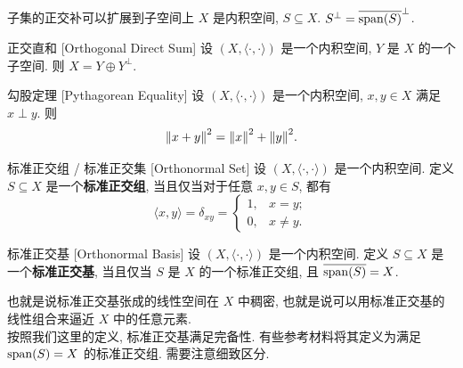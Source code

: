         \begin{ppt}
            {子集的正交补可以扩展到子空间上}
            \(X\) 是内积空间, \(S\subseteq X\). $S^\perp=\overline{\operatorname{span}(S)}^\perp$.
        \end{ppt}

        \begin{ppt}
            {正交直和}
            [Orthogonal Direct Sum]
            设 \((X, \langle\cdot,\cdot\rangle)\) 是一个内积空间, \(Y\) 是 \(X\) 的一个子空间. 则 \(X=Y\oplus Y^\perp\).
        \end{ppt}

        \begin{ppt}
            {勾股定理}
            [Pythagorean Equality]
            设 \((X, \langle\cdot,\cdot\rangle)\) 是一个内积空间, \(x,y\in X\) 满足 \(x\perp y\). 则
            \[\norm{x+y}^2=\norm{x}^2+\norm{y}^2.\]
        \end{ppt}

        \begin{dfn}
            {标准正交组 / 标准正交集}
            [Orthonormal Set]
            设 \((X, \langle\cdot,\cdot\rangle)\) 是一个内积空间. 定义 \(S\subseteq X\) 是一个\textbf{标准正交组}, 当且仅当对于任意 \(x,y\in S\), 都有
            \[\langle x,y\rangle=\delta_{xy}=\begin{cases}
                1, & x=y; \\
                0, & x\neq y.
            \end{cases}\]
        \end{dfn}

        \begin{dfn}
            [onb]
            {标准正交基}
            [Orthonormal Basis]
            设 \((X, \langle\cdot,\cdot\rangle)\) 是一个内积空间. 定义 \(S\subseteq X\) 是一个\textbf{标准正交基}, 当且仅当 \(S\) 是 \(X\) 的一个标准正交组, 且 \(\overline{\operatorname{span}(S)}=X\).
        \end{dfn}

        \begin{rmk}
            [Dedicatia]
            也就是说标准正交基张成的线性空间在 \(X\) 中稠密, 也就是说可以用标准正交基的线性组合来逼近 \(X\) 中的任意元素.\\
            按照我们这里的定义, 标准正交基满足完备性. 有些参考材料将其定义为满足 \(\operatorname{span}(S)=X\) 的标准正交组. 需要注意细致区分. 
        \end{rmk}


